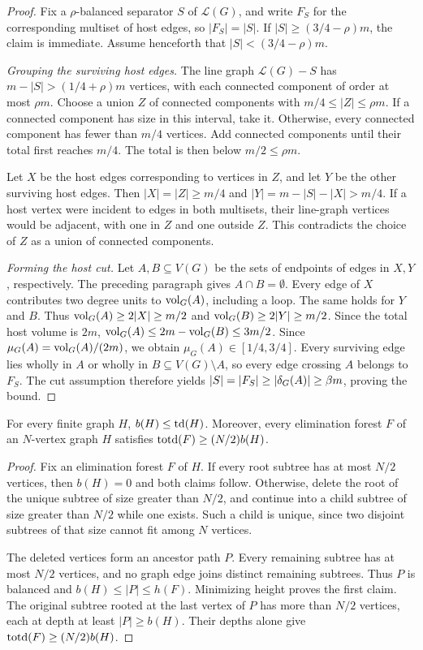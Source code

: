 \begin{proof}
Fix a $\rho$-balanced separator $S$ of $\mathcal L(G)$, and write
$F_S$ for the corresponding multiset of host edges, so $|F_S|=|S|$.
If $|S|\ge(3/4-\rho)m$, the claim is immediate. Assume henceforth
that $|S|<(3/4-\rho)m$.

\emph{Grouping the surviving host edges.}
The line graph $\mathcal L(G)-S$ has
$m-|S|>(1/4+\rho)m$ vertices, with each connected component of order at
most $\rho m$. Choose a union $Z$ of connected components with
$m/4\le|Z|\le\rho m$. If a connected component has size in this interval,
take it. Otherwise, every connected component has fewer than $m/4$ vertices.
Add connected components until their total first reaches $m/4$.
The total is then below $m/2\le\rho m$.

Let $X$ be the host edges corresponding to vertices in $Z$, and
let $Y$ be the other surviving host edges. Then
$|X|=|Z|\ge m/4$ and
$|Y|=m-|S|-|X|>m/4$.
If a host vertex were incident to edges in both multisets, their
line-graph vertices would be adjacent, with one in $Z$ and one
outside $Z$. This contradicts the choice of $Z$ as a union of
connected components.

\emph{Forming the host cut.}
Let $A,B\subseteq V(G)$ be the sets of endpoints of edges in
$X,Y$, respectively. The preceding paragraph gives
$A\cap B=\emptyset$. Every edge of $X$
contributes two degree units to $\operatorname{vol}_G(A)$, including a loop.
The same holds for $Y$ and $B$. Thus
$\operatorname{vol}_G(A)\ge2|X|\ge m/2$ and
$\operatorname{vol}_G(B)\ge2|Y|\ge m/2$.
Since the total host volume is $2m$,
$\operatorname{vol}_G(A)\le2m-\operatorname{vol}_G(B)\le3m/2$.
Since $\mu_G(A)=\operatorname{vol}_G(A)/(2m)$, we obtain
$\mu_G(A)\in[1/4,3/4]$.
Every surviving edge lies wholly in $A$ or wholly in
$B\subseteq V(G)\setminus A$, so every edge crossing $A$ belongs
to $F_S$. The cut assumption therefore yields
$|S|=|F_S|\ge|\delta_G(A)|\ge\beta m$, proving the bound.
\end{proof}

\begin{lemma}\label{lem:balanced-by-td}
For every finite graph $H$, $b(H)\leq\operatorname{td}(H)$.
Moreover, every elimination forest $F$ of an $N$-vertex graph $H$
satisfies $\operatorname{totd}(F)\geq(N/2)b(H)$.
\end{lemma}

\begin{proof}
Fix an elimination forest $F$ of $H$. If every root subtree has
at most $N/2$ vertices, then $b(H)=0$ and both claims follow.
Otherwise, delete the root of the unique subtree of size greater
than $N/2$, and continue into a child subtree of size greater than
$N/2$ while one exists. Such a child is unique, since two disjoint
subtrees of that size cannot fit among $N$ vertices.

The deleted vertices form an ancestor path $P$. Every remaining
subtree has at most $N/2$ vertices, and no graph edge joins distinct
remaining subtrees. Thus $P$ is balanced and
$b(H)\leq|P|\leq h(F)$. Minimizing height proves the first claim.
The original subtree rooted at the last vertex of $P$ has more than
$N/2$ vertices, each at depth at least $|P|\geq b(H)$. Their depths
alone give $\operatorname{totd}(F)\geq(N/2)b(H)$.
\end{proof}

